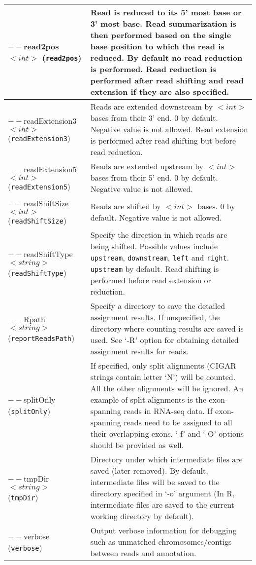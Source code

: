 \documentclass[12pt]{report}
\newcommand{\code}[1]{{\small\texttt{#1}}}
\newcommand{\R}{\textsf{R}}
\begin{document}
\begin{longtable}{|p{5cm}|p{11cm}|}
\hline
$--$read2pos $<int>$ \newline (\code{read2pos}) & Read is reduced to its 5' most base or 3' most base. Read summarization is then performed based on the single base position to which the read is reduced. By default no read reduction is performed. Read reduction is performed after read shifting and read extension if they are also specified. \\
\hline
$--$readExtension3 $<int>$ \newline (\code{readExtension3}) & Reads are extended downstream by $<int>$ bases from their 3' end. 0 by default. Negative value is not allowed. Read extension is performed after read shifting but before read reduction.\\
\hline
$--$readExtension5 $<int>$ \newline (\code{readExtension5}) & Reads are extended upstream by $<int>$ bases from their 5' end. 0 by default. Negative value is not allowed. \\
\hline
$--$readShiftSize $<int>$ \newline (\code{readShiftSize}) & Reads are shifted by $<int>$ bases. 0 by default. Negative value is not allowed. \\
\hline
$--$readShiftType $<string>$ \newline (\code{readShiftType}) & Specify the direction in which reads are being shifted. Possible values include \code{upstream}, \code{downstream}, \code{left} and \code{right}.  \code{upstream} by default. Read shifting is performed before read extension or reduction. \\
\hline
$--$Rpath $<string>$ \newline (\code{reportReadsPath}) & Specify a directory to save the detailed assignment results. If unspecified, the directory where counting results are saved is used. See `-R' option for obtaining detailed assignment results for reads.\\
\hline
$--$splitOnly \newline (\code{splitOnly}) & If specified, only split alignments (CIGAR strings contain letter `N') will be counted. All the other alignments will be ignored. An example of split alignments is the exon-spanning reads in RNA-seq data. If exon-spanning reads need to be assigned to all their overlapping exons, `-f' and `-O' options should be provided as well.\\
\hline
$--$tmpDir $<string>$ \newline (\code{tmpDir}) & Directory under which intermediate files are saved (later removed). By default, intermediate files will be saved to the directory specified in `-o' argument (In \R, intermediate files are saved to the current working directory by default).\\
\hline
$--$verbose \newline (\code{verbose}) & Output verbose information for debugging such as unmatched chromosomes/contigs between reads and annotation.\\
\hline
\end{longtable}
\end{document}
